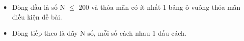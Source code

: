 \begin{itemize}
	\item Dòng đầu là số N  $\le$  200 và thỏa mãn có ít nhất 1 bảng ô vuông thỏa mãn điều kiện đề bài.
	\item Dòng tiếp theo là dãy N số, mỗi số cách nhau 1 dấu cách.
\end{itemize}

\